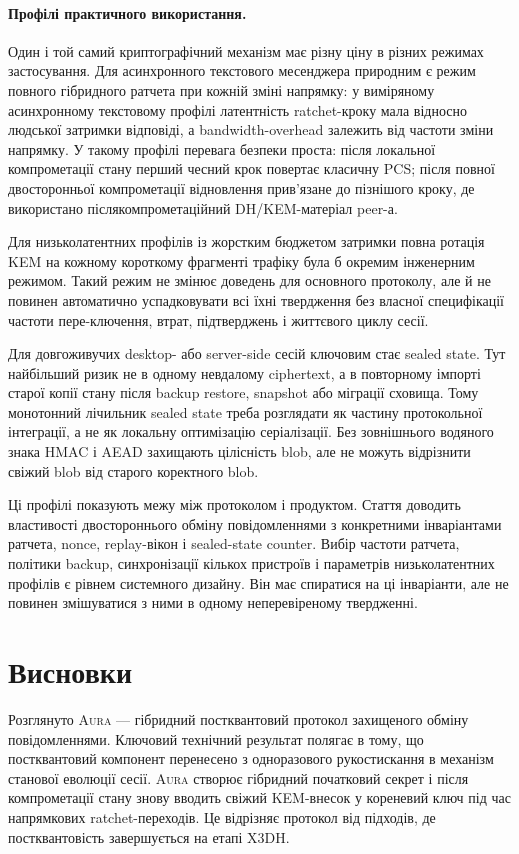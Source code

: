 \documentclass[11pt,a4paper]{article}
\theoremstyle{definition}
\newcommand{\Aura}{\mbox{\normalfont\scshape Aura}}
\begin{document}
\paragraph{Профілі практичного використання.}
Один і той самий криптографічний механізм має різну ціну в різних
режимах застосування. Для асинхронного текстового месенджера природним
є режим повного гібридного ратчета при кожній зміні напрямку: у
виміряному асинхронному текстовому профілі латентність ratchet-кроку
мала відносно людської затримки відповіді, а bandwidth-overhead
залежить від частоти зміни напрямку.
У такому профілі перевага безпеки проста: після локальної компрометації
стану перший чесний крок повертає класичну PCS; після повної
двосторонньої компрометації відновлення прив'язане до пізнішого кроку,
де використано післякомпрометаційний DH/KEM-матеріал peer-а.

Для низьколатентних профілів із жорстким бюджетом затримки повна
ротація KEM на кожному короткому фрагменті трафіку була б окремим
інженерним режимом. Такий режим не змінює доведень для основного
протоколу, але й не повинен автоматично успадковувати всі їхні
твердження без власної специфікації частоти пере-ключення, втрат,
підтверджень і життєвого циклу сесії.

Для довгоживучих desktop- або server-side сесій ключовим стає sealed
state. Тут найбільший ризик не в одному невдалому ciphertext, а в
повторному імпорті старої копії стану після backup restore, snapshot або
міграції сховища. Тому монотонний лічильник sealed state треба
розглядати як частину протокольної інтеграції, а не як локальну
оптимізацію серіалізації. Без зовнішнього водяного знака HMAC і AEAD
захищають цілісність blob, але не можуть відрізнити свіжий blob від
старого коректного blob.

Ці профілі показують межу між протоколом і продуктом. Стаття доводить
властивості двостороннього обміну повідомленнями з конкретними
інваріантами ратчета, nonce, replay-вікон і sealed-state counter.
Вибір частоти ратчета, політики backup, синхронізації кількох пристроїв
і параметрів низьколатентних профілів є рівнем системного дизайну. Він має спиратися
на ці інваріанти, але не повинен змішуватися з ними в одному
неперевіреному твердженні.

\section{Висновки}\label{sec:conclusion}

Розглянуто \Aura{} — гібридний постквантовий протокол захищеного
обміну повідомленнями. Ключовий технічний результат полягає в тому, що
постквантовий компонент перенесено з одноразового рукостискання в
механізм станової еволюції сесії. \Aura{} створює гібридний початковий
секрет і після компрометації стану знову вводить свіжий KEM-внесок у
кореневий ключ під час напрямкових ratchet-переходів. Це відрізняє протокол від підходів, де
постквантовість завершується на етапі X3DH.
\end{document}
